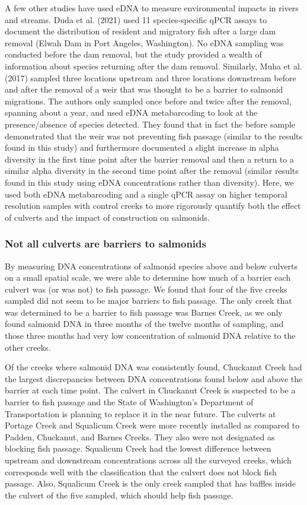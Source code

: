 \documentclass[
]{article}
\begin{document}
A few other studies have used eDNA to measure environmental impacts in
rivers and streams. Duda et al. (2021) used 11 species-specific qPCR
assays to document the distribution of resident and migratory fish after
a large dam removal (Elwah Dam in Port Angeles, Washington). No eDNA
sampling was conducted before the dam removal, but the study provided a
wealth of information about species returning after the dam removal.
Similarly, Muha et al. (2017) sampled three locations upstream and three
locations downstream before and after the removal of a weir that was
thought to be a barrier to salmonid migrations. The authors only sampled
once before and twice after the removal, spanning about a year, and used
eDNA metabarcoding to look at the presence/absence of species detected.
They found that in fact the before sample demonstrated that the weir was
not preventing fish passage (similar to the results found in this study)
and furthermore documented a slight increase in alpha diversity in the
first time point after the barrier removal and then a return to a
similar alpha diversity in the second time point after the removal
(similar results found in this study using eDNA concentrations rather
than diversity). Here, we used both eDNA metabarcoding and a single qPCR
assay on higher temporal resolution samples with control creeks to more
rigorously quantify both the effect of culverts and the impact of
construction on salmonids.

\hypertarget{not-all-culverts-are-barriers-to-salmonids}{%
\subsubsection{Not all culverts are barriers to
salmonids}\label{not-all-culverts-are-barriers-to-salmonids}}

By measuring DNA concentrations of salmonid species above and below
culverts on a small spatial scale, we were able to determine how much of
a barrier each culvert was (or was not) to fish passage. We found that
four of the five creeks sampled did not seem to be major barriers to
fish passage. The only creek that was determined to be a barrier to fish
passage was Barnes Creek, as we only found salmonid DNA in three months
of the twelve months of sampling, and those three months had very low
concentration of salmonid DNA relative to the other creeks.

Of the creeks where salmonid DNA was consistently found, Chuckanut Creek
had the largest discrepancies between DNA concentrations found below and
above the barrier at each time point. The culvert in Chuckanut Creek is
suspected to be a barrier to fish passage and the State of Washington's
Department of Transportation is planning to replace it in the near
future. The culverts at Portage Creek and Squalicum Creek were more
recently installed as compared to Padden, Chuckanut, and Barnes Creeks.
They also were not designated as blocking fish passage. Squalicum Creek
had the lowest difference between upstream and downstream concentrations
across all the surveyed creeks, which corresponds well with the
classification that the culvert does not block fish passage. Also,
Squalicum Creek is the only creek sampled that has baffles inside the
culvert of the five sampled, which should help fish passage.
\end{document}
